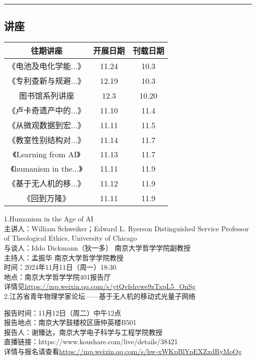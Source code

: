 \documentclass[letterpaper, 12pt]{article}
\begin{document}
\hrule
\pagebreak
\begin{multicols}{2}

\section{讲座}
\begin{tabular}{|c|c|c|}
    \hline
    往期讲座 & 开展日期 & 刊载日期\\
    \hline\hline
    《电池及电化学能...》 & 11.24 & 10.3\\
    《专利查新与规避...》 & 12.19 & 10.3\\
    图书馆系列讲座 & 12.3 & 10.20\\
    《卢卡奇遗产中的...》 & 11.10 & 11.4\\
    《从微观数据到宏...》& 11.11 & 11.5\\
    《教室性别结构对...》 & 11.14 & 11.7\\
    《Learning from AI》 & 11.13 & 11.7\\
    《humanism in the...》 & 11.11 & 11.9\\
    《基于无人机的移...》 & 11.12 & 11.9\\
    《回到万隆》 & 11.11 & 11.9\\
    \hline
\end{tabular}

1.Humanism in the Age of AI\\
主讲人：William Schweiker；Edward L. Ryerson Distinguished Service Professor of Theological Ethics, University of Chicago\\
与谈人：Iddo Dickmann（狄一多） 南京大学哲学学院副教授\\
主持人：孟振华  南京大学哲学学院教授\\
时间：2024年11月11日（周一）18:30\\
地点：南京大学哲学学院401报告厅\\
详情见\url{https://mp.weixin.qq.com/s/ytQvfshvwe9zTxpL5_OnSg}\\

2.江苏省青年物理学家论坛——基于无人机的移动式光量子网络

报告时间：11月12日（周二）中午12点\\
报告地点：南京大学鼓楼校区唐仲英楼B501\\
报告人：谢臻达，南京大学电子科学与工程学院教授\\
直播链接：https://www.koushare.com/live/details/38421\\
详情与报名请查看\url{https://mp.weixin.qq.com/s/hw-xWKpBlYpEXZxdRyMoOg}\\


\end{multicols}
\end{document}
